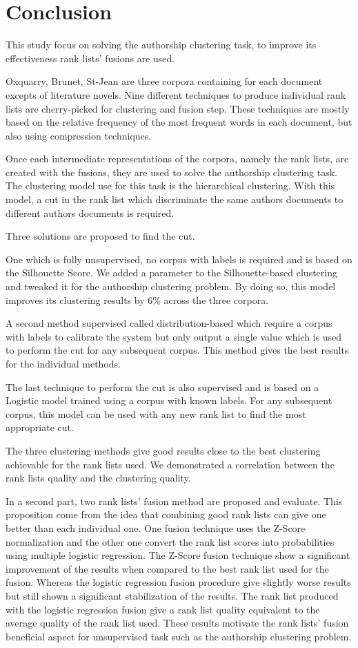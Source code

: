 \chapter{Conclusion \label{sec:conclusion}}

This study focus on solving the authorship clustering task, to improve its effectiveness rank lists' fusions are used.

Oxquarry, Brunet, St-Jean are three corpora containing for each document excepts of literature novels.
Nine different techniques to produce individual rank lists are cherry-picked for clustering and fusion step.
These techniques are mostly based on the relative frequency of the most frequent words in each document, but also using compression techniques.

Once each intermediate representations of the corpora, namely the rank lists, are created with the fusions, they are used to solve the authorship clustering task.
The clustering model use for this task is the hierarchical clustering.
With this model, a cut in the rank list which discriminate the same authors documents to different authors documents is required.

Three solutions are proposed to find the cut.

One which is fully unsupervised, no corpus with labels is required and is based on the Silhouette Score.
We added a parameter to the Silhouette-based clustering and tweaked it for the authorship clustering problem.
By doing so, this model improves its clustering results by 6\% across the three corpora.

A second method supervised called distribution-based which require a corpus with labels to calibrate the system but only output a single value which is used to perform the cut for any subsequent corpus.
This method gives the best results for the individual methods.

The last technique to perform the cut is also supervised and is based on a Logistic model trained using a corpus with known labels.
For any subsequent corpus, this model can be used with any new rank list to find the most appropriate cut.

The three clustering methods give good results close to the best clustering achievable for the rank lists used.
We demonstrated a correlation between the rank lists quality and the clustering quality.

In a second part, two rank lists' fusion method are proposed and evaluate.
This proposition come from the idea that combining good rank lists can give one better than each individual one.
One fusion technique uses the Z-Score normalization and the other one convert the rank list scores into probabilities using multiple logistic regression.
The Z-Score fusion technique show a significant improvement of the results when compared to the best rank list used for the fusion.
Whereas the logistic regression fusion procedure give slightly worse results but still shown a significant stabilization of the results.
The rank list produced with the logistic regression fusion give a rank list quality equivalent to the average quality of the rank list used.
These results motivate the rank lists' fusion beneficial aspect for unsupervised task such as the authorship clustering problem.

